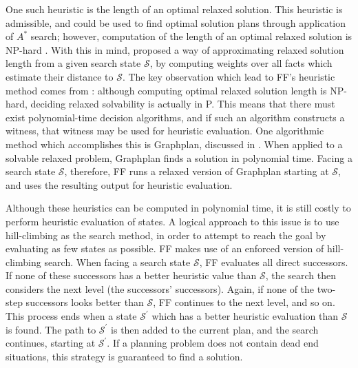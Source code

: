 One such heuristic is the length of an optimal relaxed solution. This heuristic is admissible, and could be used to find optimal solution plans through application of $A^*$ search; however, computation of the length of an optimal relaxed solution is NP-hard \cite{Bylander:1994kx}. With this in mind, \cite{Bonet:1997uq} proposed a way of approximating relaxed solution length from a given search state $\mathcal{S}$, by computing weights over all facts which estimate their distance to $\mathcal{S}$. The key observation which lead to FF's heuristic method comes from \cite{Bylander:1994kx}: although computing optimal relaxed solution length is NP-hard, deciding relaxed solvability is actually in P. This means that there must exist polynomial-time decision algorithms, and if such an algorithm constructs a witness, that witness may be used for heuristic evaluation. One algorithmic method which accomplishes this is Graphplan, discussed in \cite{Blum:1997vn}. When applied to a solvable relaxed problem, Graphplan finds a solution in polynomial time. Facing a search state $\mathcal{S}$, therefore, FF runs a relaxed version of Graphplan starting at $\mathcal{S}$, and uses the resulting output for heuristic evaluation.

Although these heuristics can be computed in polynomial time, it is still costly to perform heuristic evaluation of states. A logical approach to this issue is to use hill-climbing as the search method, in order to attempt to reach the goal by evaluating as few states as possible. FF makes use of an enforced version of hill-climbing search. When facing a search state $\mathcal{S}$, FF evaluates all direct successors. If none of these successors has a better heuristic value than $\mathcal{S}$, the search then considers the next level (the successors' successors). Again, if none of the two-step successors looks better than $\mathcal{S}$, FF continues to the next level, and so on. This process ends when a state $\mathcal{S}^\prime$ which has a better heuristic evaluation than $\mathcal{S}$ is found. The path to $\mathcal{S}^\prime$ is then added to the current plan, and the search continues, starting at $\mathcal{S}^\prime$. If a planning problem does not contain dead end situations, this strategy is guaranteed to find a solution. 